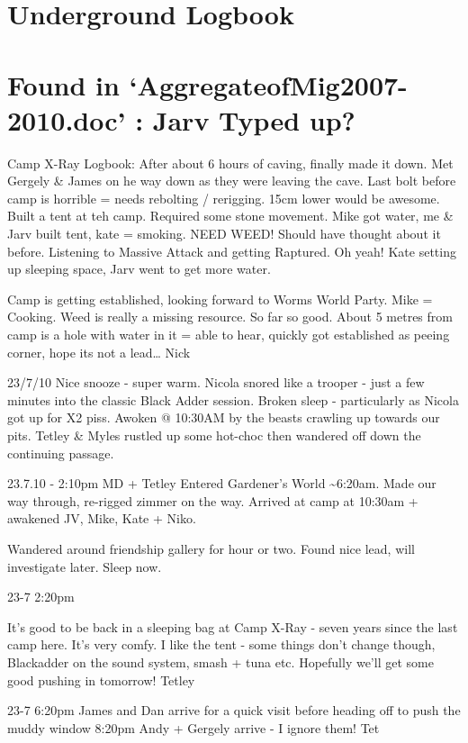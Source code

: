
\section{Underground Logbook}

\section{Found in `AggregateofMig2007-2010.doc' : Jarv Typed up?}

Camp X-Ray Logbook: After about 6 hours of caving, finally made it down.
Met Gergely \& James on he way down as they were leaving the cave. Last
bolt before camp is horrible = needs rebolting / rerigging. 15cm lower
would be awesome. Built a tent at teh camp. Required some stone
movement. Mike got water, me \& Jarv built tent, kate = smoking. NEED
WEED! Should have thought about it before. Listening to Massive Attack
and getting Raptured. Oh yeah! Kate setting up sleeping space, Jarv went
to get more water.

Camp is getting established, looking forward to Worms World Party. Mike
= Cooking. Weed is really a missing resource. So far so good. About 5
metres from camp is a hole with water in it = able to hear, quickly got
established as peeing corner, hope its not a lead\ldots{} Nick

23/7/10 Nice snooze - super warm. Nicola snored like a trooper - just a
few minutes into the classic Black Adder session. Broken sleep -
particularly as Nicola got up for X2 piss. Awoken @ 10:30AM by the
beasts crawling up towards our pits. Tetley \& Myles rustled up some
hot-choc then wandered off down the continuing passage.

23.7.10 - 2:10pm MD + Tetley Entered Gardener's World
\textasciitilde{}6:20am. Made our way through, re-rigged zimmer on the
way. Arrived at camp at 10:30am + awakened JV, Mike, Kate + Niko.

Wandered around friendship gallery for hour or two. Found nice lead,
will investigate later. Sleep now.

23-7 2:20pm

It's good to be back in a sleeping bag at Camp X-Ray - seven years since
the last camp here. It's very comfy. I like the tent - some things don't
change though, Blackadder on the sound system, smash + tuna etc.
Hopefully we'll get some good pushing in tomorrow! Tetley

23-7 6:20pm James and Dan arrive for a quick visit before heading off to
push the muddy window 8:20pm Andy + Gergely arrive - I ignore them! Tet

